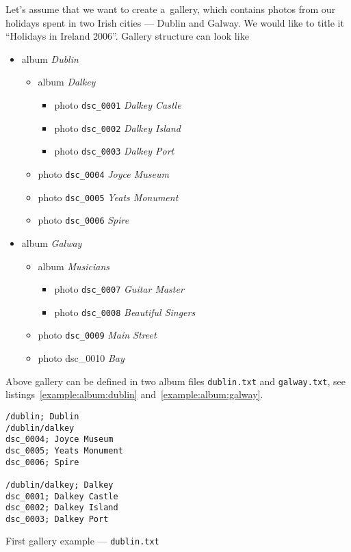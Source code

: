 \documentclass{article}
\begin{document}
Let's assume that we want to create a~gallery, which contains photos from
our holidays spent in two Irish cities --- Dublin and Galway. We would like
to title it ``Holidays in Ireland 2006''. Gallery structure can look like
\begin{itemize}
\item album \textit{Dublin}
    \begin{itemize}
    \item album \textit{Dalkey}
        \begin{itemize}
        \item photo \texttt{dsc\_0001} \textit{Dalkey Castle}
        \item photo \texttt{dsc\_0002} \textit{Dalkey Island}
        \item photo \texttt{dsc\_0003} \textit{Dalkey Port}
        \end{itemize}
    \item photo \texttt{dsc\_0004} \textit{Joyce Museum}
    \item photo \texttt{dsc\_0005} \textit{Yeats Monument}
    \item photo \texttt{dsc\_0006} \textit{Spire}
    \end{itemize}
\item album \textit{Galway}
    \begin{itemize}
    \item album \textit{Musicians}
        \begin{itemize}
        \item photo \texttt{dsc\_0007} \textit{Guitar Master}
        \item photo \texttt{dsc\_0008} \textit{Beautiful Singers}
        \end{itemize}
    \item photo \texttt{dsc\_0009} \textit{Main Street}
    \item photo dsc\_0010 \textit{Bay}
    \end{itemize}
\end{itemize}

Above gallery can be defined in two album files \texttt{dublin.txt} and
\texttt{galway.txt}, see listings~\ref{example:album:dublin}
and~\ref{example:album:galway}.

\begin{listing}
\begin{lstlisting}
/dublin; Dublin
/dublin/dalkey
dsc_0004; Joyce Museum
dsc_0005; Yeats Monument
dsc_0006; Spire

/dublin/dalkey; Dalkey
dsc_0001; Dalkey Castle
dsc_0002; Dalkey Island
dsc_0003; Dalkey Port
\end{lstlisting}
\caption{First gallery example --- \texttt{dublin.txt}}\label{example:album:dublin}
\end{listing}
\end{document}
